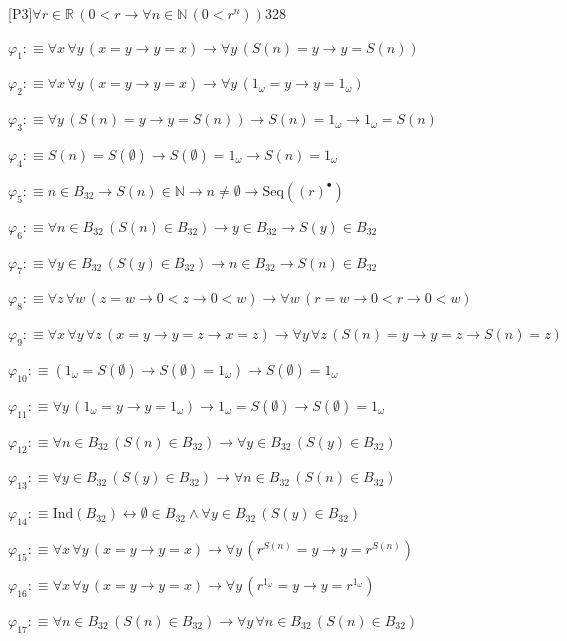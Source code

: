 \begin{fullproof}{[P3]}{$\forall r \in \mathbb{R}\,(0 < r \to \forall n \in \mathbb{N}\,(0 < {{r}^{n}}))$}{328}
\begin{abbrevlist}
\item $\varphi_{1} :\equiv \forall x\,\forall y\,(x = y \to y = x) \to \forall y\,(S(n) = y \to y = S(n))$
\item $\varphi_{2} :\equiv \forall x\,\forall y\,(x = y \to y = x) \to \forall y\,(1_{\omega} = y \to y = 1_{\omega})$
\item $\varphi_{3} :\equiv \forall y\,(S(n) = y \to y = S(n)) \to S(n) = 1_{\omega} \to 1_{\omega} = S(n)$
\item $\varphi_{4} :\equiv S(n) = S(\emptyset) \to S(\emptyset) = 1_{\omega} \to S(n) = 1_{\omega}$
\item $\varphi_{5} :\equiv n \in B_{32} \to S(n) \in \mathbb{N} \to n \neq \emptyset \to \mathrm{Seq}({(r)^{\bullet}})$
\item $\varphi_{6} :\equiv \forall n \in B_{32}\,(S(n) \in B_{32}) \to y \in B_{32} \to S(y) \in B_{32}$
\item $\varphi_{7} :\equiv \forall y \in B_{32}\,(S(y) \in B_{32}) \to n \in B_{32} \to S(n) \in B_{32}$
\item $\varphi_{8} :\equiv \forall z\,\forall w\,(z = w \to 0 < z \to 0 < w) \to \forall w\,(r = w \to 0 < r \to 0 < w)$
\item $\varphi_{9} :\equiv \forall x\,\forall y\,\forall z\,(x = y \to y = z \to x = z) \to \forall y\,\forall z\,(S(n) = y \to y = z \to S(n) = z)$
\item $\varphi_{10} :\equiv (1_{\omega} = S(\emptyset) \to S(\emptyset) = 1_{\omega}) \to S(\emptyset) = 1_{\omega}$
\item $\varphi_{11} :\equiv \forall y\,(1_{\omega} = y \to y = 1_{\omega}) \to 1_{\omega} = S(\emptyset) \to S(\emptyset) = 1_{\omega}$
\item $\varphi_{12} :\equiv \forall n \in B_{32}\,(S(n) \in B_{32}) \to \forall y \in B_{32}\,(S(y) \in B_{32})$
\item $\varphi_{13} :\equiv \forall y \in B_{32}\,(S(y) \in B_{32}) \to \forall n \in B_{32}\,(S(n) \in B_{32})$
\item $\varphi_{14} :\equiv \mathrm{Ind}(B_{32}) \leftrightarrow \emptyset \in B_{32} \land \forall y \in B_{32}\,(S(y) \in B_{32})$
\item $\varphi_{15} :\equiv \forall x\,\forall y\,(x = y \to y = x) \to \forall y\,({{r}^{S(n)}} = y \to y = {{r}^{S(n)}})$
\item $\varphi_{16} :\equiv \forall x\,\forall y\,(x = y \to y = x) \to \forall y\,({{r}^{1_{\omega}}} = y \to y = {{r}^{1_{\omega}}})$
\item $\varphi_{17} :\equiv \forall n \in B_{32}\,(S(n) \in B_{32}) \to \forall y\,\forall n \in B_{32}\,(S(n) \in B_{32})$

\end{abbrevlist}
\end{fullproof}
